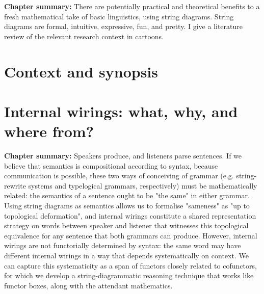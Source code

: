 



\maketitle%

\tableofcontents{}

\setcounter{chapter}{-1}
\textbf{Chapter summary:} There are potentially practical and theoretical benefits to a fresh mathematical take of basic linguistics, using string diagrams. String diagrams are formal, intuitive, expressive, fun, and pretty. I give a literature review of the relevant research context in cartoons.
\chapter{Context and synopsis}
\newpage

\newpage
\label{sec:proctheory}
\newpage


\chapter{Internal wirings: what, why, and where from?}
\textbf{Chapter summary:} Speakers produce, and listeners parse sentences. If we believe that semantics is compositional according to syntax, because communication is possible, these two ways of conceiving of grammar (e.g. string-rewrite systems and typelogical grammars, respectively) must be mathematically related: the semantics of a sentence ought to be "the same" in either grammar. Using string diagrams as semantics allows us to formalise "sameness" as "up to topological deformation", and internal wirings constitute a shared representation strategy on words between speaker and listener that witnesses this topological equivalence for any sentence that both grammars can produce. However, internal wirings are not functorially determined by syntax: the same word may have different internal wirings in a way that depends systematically on context. We can capture this systematicity as a span of functors closely related to cofunctors, for which we develop a string-diagrammatic reasoning technique that works like functor boxes, along with the attendant mathematics.
\newpage



